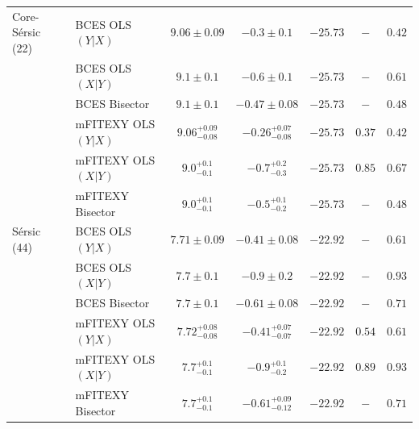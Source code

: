 \documentclass[preprint2]{emulateapj}
\begin{document}
\begin{table}
\begin{tabular}{llccccc}
Core-S\'ersic (22) & BCES OLS$(Y|X)$   & $9.06 \pm 0.09$ & $-0.3  \pm 0.1$  & $-25.73$ & $-$    & $0.42$ \\ 
                   & BCES OLS$(X|Y)$   & $9.1  \pm 0.1$  & $-0.6  \pm 0.1$  & $-25.73$ & $-$    & $0.61$ \\
                   & BCES Bisector     & $9.1  \pm 0.1$  & $-0.47 \pm 0.08$ & $-25.73$ & $-$    & $0.48$ \\
                   & mFITEXY OLS$(Y|X)$ & $9.06^{+0.09}_{-0.08}$ & $-0.26^{+0.07}_{-0.08}$ & $-25.73$ & $0.37$ & $0.42$ \\
                   & mFITEXY OLS$(X|Y)$ & $9.0^{+0.1}_{-0.1}$ & $-0.7^{+0.2}_{-0.3}$ & $-25.73$ & $0.85$ & $0.67$ \\
                   & mFITEXY Bisector   & $9.0^{+0.1}_{-0.1}$ & $-0.5^{+0.1}_{-0.2}$ & $-25.73$ & $-$    & $0.48$ \\

S\'ersic (44) & BCES OLS$(Y|X)$   & $7.71 \pm 0.09$ & $-0.41 \pm 0.08$ & $-22.92$ & $-$    & $0.61$ \\
              & BCES OLS$(X|Y)$   & $7.7  \pm 0.1$  & $-0.9  \pm 0.2 $ & $-22.92$ & $-$    & $0.93$ \\
              & BCES Bisector     & $7.7  \pm 0.1$  & $-0.61 \pm 0.08$ & $-22.92$ & $-$    & $0.71$ \\
              & mFITEXY OLS$(Y|X)$ & $7.72^{+0.08}_{-0.08}$ & ${-0.41}^{+0.07}_{-0.07}$ & $-22.92$ & $0.54$ & $0.61$ \\
              & mFITEXY OLS$(X|Y)$ & $7.7^{+0.1}_{-0.1}$ & $-0.9^{+0.1}_{-0.2}$ & $-22.92$ & $0.89$ & $0.93$ \\
              & mFITEXY Bisector   & $7.7^{+0.1}_{-0.1}$ & $-0.61^{+0.09}_{-0.12}$ & $-22.92$ & $-$	& $0.71$ \\


\end{tabular}
\end{table}
\end{document}
